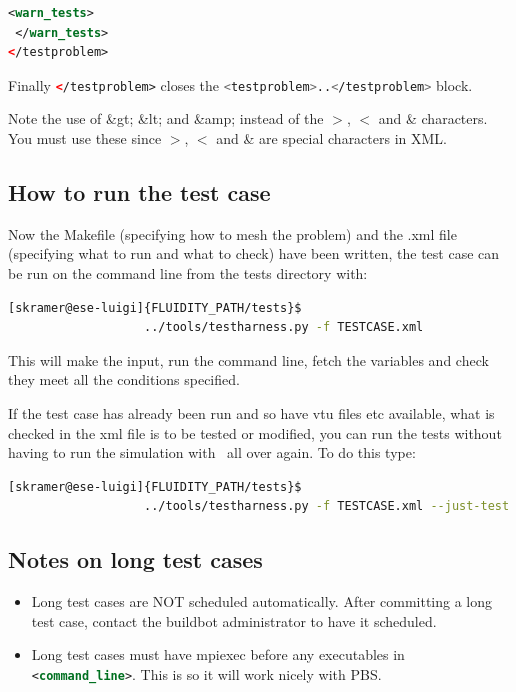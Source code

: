 \begin{example}
\begin{lstlisting}[language=xml] 
 <warn_tests>
 </warn_tests>
</testproblem>
\end{lstlisting}
\end{example}

Finally \lstinline[language=xml]+</testproblem>+ closes the \lstinline[language=bash]+<testproblem>..</testproblem>+ block.

Note the use of \&gt; \&lt; and \&amp; instead of the $>$, $<$ and \& characters. You must use these since $>$, $<$ and \& are special characters in XML.

\subsection{How to run the test case}

Now the Makefile (specifying how to mesh the problem) and the .xml file (specifying what to run and what to check) have been written, the test case can be run on the command line from the tests directory with: 

\begin{example}
\begin{lstlisting}[language=bash] 
[skramer@ese-luigi]{FLUIDITY_PATH/tests}$ 
                   ../tools/testharness.py -f TESTCASE.xml
\end{lstlisting}
\end{example}

This will make the input, run the command line, fetch the variables and check they meet all the conditions specified.

If the test case has already been run and so have vtu files etc available, what is checked in the xml file is to be tested or modified, you can run the tests without having to run the simulation with \fluidity\ all over again. To do this type:

\begin{example}
\begin{lstlisting}[language=bash] 
[skramer@ese-luigi]{FLUIDITY_PATH/tests}$ 
                   ../tools/testharness.py -f TESTCASE.xml --just-test
\end{lstlisting}
\end{example}

\subsection{Notes on long test cases}
\begin{itemize}
\item Long test cases are NOT scheduled automatically. After committing a long test case, contact the buildbot administrator to have it scheduled.
\item Long test cases must have mpiexec before any executables in \lstinline[language=xml]+<command_line>+. This is so it will work nicely with PBS. 
\end{itemize}

